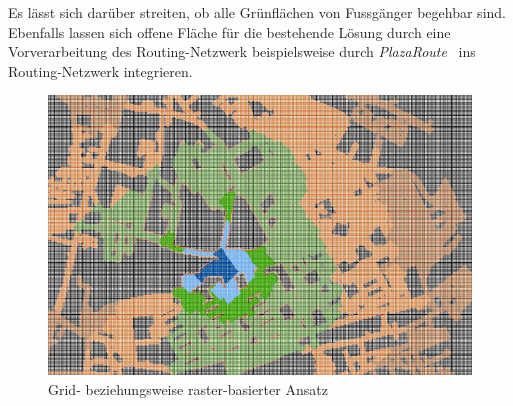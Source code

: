 Es lässt sich darüber streiten, ob alle Grünflächen von Fussgänger begehbar sind.
Ebenfalls lassen sich offene Fläche für die bestehende Lösung durch eine Vorverarbeitung des Routing-Netzwerk beispielsweise durch \emph{PlazaRoute}~\cite{plaza_route} ins Routing-Netzwerk integrieren.

\begin{figure}[ht]
    \centering
    \includegraphics[width=0.6\linewidth]{start/img/grid_based_approach.png}
    \caption[Grid- beziehungsweise raster-basierter Ansatz]{Grid- beziehungsweise raster-basierter Ansatz~\cite{pedestrian_accessibility_planning}}
    \label{fig:grid_based_approach}
\end{figure}
